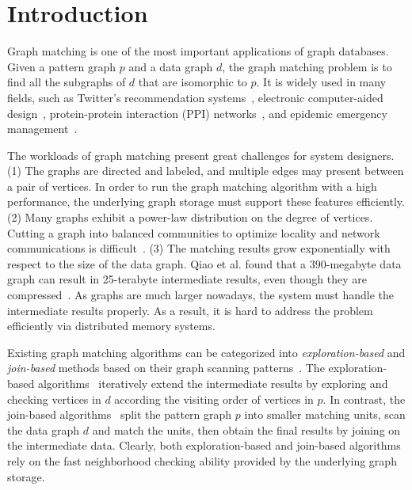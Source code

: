 \section{Introduction}
Graph matching is one of the most important applications of graph databases.
Given a pattern graph $p$ and a data graph $d$, the graph matching problem is to find all the subgraphs of $d$ that are isomorphic to $p$.
It is widely used in many fields,
such as Twitter's recommendation systems~\cite{DBLP:journals/pvldb/GuptaSGGZLL14,DBLP:journals/pvldb/SharmaJBLL16},
electronic computer-aided design~\cite{DBLP:conf/dac/OhlrichEGS93},
protein-protein interaction (PPI) networks~\cite{milenkovic2008uncovering},
and epidemic emergency management~\cite{info:doi/10.2196/26836}.

The workloads of graph matching present great challenges for system designers.
(1) The graphs are directed and labeled, and multiple edges may present between a pair of vertices.
In order to run the graph matching algorithm with a high performance, the underlying graph storage must support these features efficiently.
(2) Many graphs exhibit a power-law distribution on the degree of vertices.
Cutting a graph into balanced communities to optimize locality and network communications is difficult~\cite{DBLP:journals/im/LeskovecLDM09}.
(3) The matching results grow exponentially with respect to the size of the data graph.
Qiao et al. found that a 390-megabyte data graph can result in 25-terabyte intermediate results, even though they are compressed~\cite{DBLP:journals/pvldb/QiaoZC17}.
As graphs are much larger nowadays, the system must handle the intermediate results properly.
As a result, it is hard to address the problem efficiently via distributed memory systems.

Existing graph matching algorithms can be categorized into \emph{exploration-based} and \emph{join-based} methods based on their graph scanning patterns~\cite{DBLP:journals/pvldb/SunSC0H20}.
The exploration-based algorithms~\cite{DBLP:journals/jacm/Ullmann76,DBLP:journals/pami/CordellaFSV04,DBLP:journals/pvldb/ShangZLY08,DBLP:conf/sigmod/HeS08,DBLP:conf/sigmod/HanLL13,DBLP:journals/pvldb/ZhaoH10,DBLP:journals/pvldb/LeeHKL12}
iteratively extend the intermediate results by exploring and checking vertices in $d$ according the visiting order of vertices in $p$.
In contrast, the join-based algorithms~\cite{DBLP:journals/pvldb/LaiQLC15,DBLP:journals/pvldb/QiaoZC17,DBLP:journals/pvldb/SunWWSL12,DBLP:journals/pvldb/MhedhbiS19,DBLP:journals/pvldb/LinMPS16,DBLP:journals/pvldb/AmmarMSJ18} split the pattern graph $p$ into smaller matching units, scan the data graph $d$ and match the units, then obtain the final results by joining on the intermediate data.
Clearly, both exploration-based and join-based algorithms rely on the fast neighborhood checking ability provided by the underlying graph storage.

